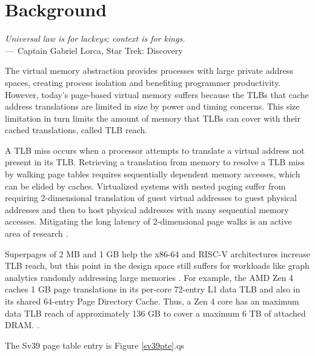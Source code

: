 
\chapter{Background}
\label{ch:Background}

\begin{epigraph}
	\emph{Universal law is for lackeys; context is for kings.}\\
	---~Captain Gabriel Lorca, Star Trek: Discovery
\end{epigraph}

The virtual memory abstraction provides processes with large private address spaces, creating process isolation and benefiting programmer productivity. However, today's page-based virtual memory suffers because the \ac{TLB}s that cache address translations are limited in size by power and timing concerns. This size limitation in turn limits the amount of memory that \ac{TLB}s can cover with their cached translations, called \ac{TLB} reach.

A TLB miss occurs when a processor attempts to translate a virtual address not present in its TLB. Retrieving a translation from memory to resolve a TLB miss by walking page tables requires sequentially dependent memory accesses, which can be elided by caches. Virtualized systems with nested paging suffer from requiring 2-dimensional translation of guest virtual addresses to guest physical addresses and then to host physical addresses with many sequential memory accesses. Mitigating the long latency of 2-dimensional page walks is an active area of research \cite{gandhi_efficient_2014, teabe_nocompromis_2021, bergman_translation_2023}.

Superpages of 2 MB and 1 GB  help the x86-64 and RISC-V architectures increase TLB reach, but this point in the design space still suffers for workloads like graph analytics randomly addressing large memories \cite{manocha_implications_2022}. For example, the AMD Zen 4 caches 1 GB page translations in its per-core 72-entry L1 data TLB and also in its shared 64-entry Page Directory Cache. Thus, a Zen 4 core has an maximum data TLB reach of approximately 136 GB to cover a maximum 6 TB of attached DRAM. \cite{advanced_micro_devices_software_2023}.


The Sv39 page table entry is Figure \ref{sv39pte}.qs

